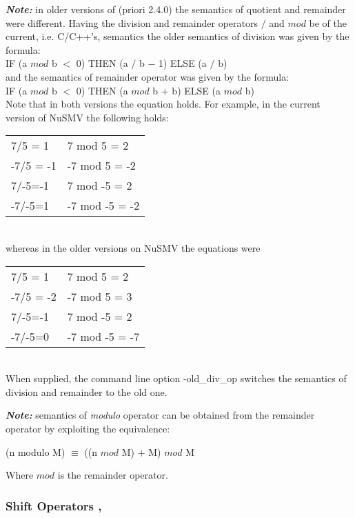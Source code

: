 \textbf{\textit{Note:}}\label{Old division semantics}
in older versions of \nusmv (priori 2.4.0)
the semantics of quotient and remainder were different.  Having the
division and remainder operators $/$ and $mod$ be of the current, i.e.
C/C++'s, semantics the older semantics of division was given by
the formula:\\
\indent IF (a $mod$  b $<$ 0) THEN (a $/$ b $-$ 1) ELSE (a $/$ b)\\
and the semantics of remainder operator was given by the formula:\\
\indent IF (a $mod$  b $<$ 0) THEN (a $mod$ b $+$ b) ELSE (a $mod$ b)\\
Note that in both versions the equation 
holds. For example, in the current version of NuSMV the following
holds:\\
\begin{tabular}{ll}
 7/5 = 1   &  7 mod 5 = 2\\
 -7/5 = -1 & -7 mod 5 = -2\\
 7/-5=-1   &  7 mod -5 = 2\\
 -7/-5=1   & -7 mod -5 = -2
\end{tabular}\\
whereas in the older versions on NuSMV the equations were\\
\begin{tabular}{ll}
 7/5 = 1   &  7 mod 5 = 2\\
 -7/5 = -2 & -7 mod 5 = 3\\
 7/-5=-1   &  7 mod -5 = 2\\
 -7/-5=0   & -7 mod -5 = -7
\end{tabular}\\
When supplied, the command line option -old\_div\_op switches the
semantics of division and remainder to the old one.

\bigskip
\textbf{\textit{Note:}}\label{Remainder vs Modulo operator}
semantics of \emph{modulo} operator can be obtained from the
remainder operator by exploiting the equivalence:

\indent (n modulo M) $\equiv$ ((n $mod$ M) $+$ M) $mod$ M

Where $mod$ is the remainder operator.

\subsubsection{Shift Operators \operator{<<}, \operator{>>}}
\label{Shift Operators}
\index{\operator{<<}, \operator{>>}}

